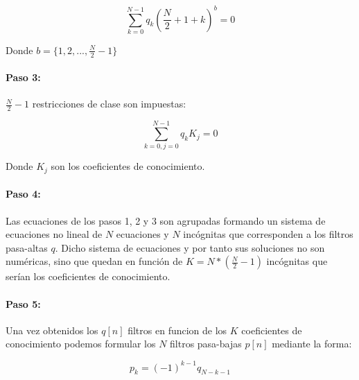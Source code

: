 \documentclass[11pt]{article}
\begin{document}
\begin{equation}
    \sum_{k=0}^{N - 1} q_{k}(\frac{N}{2} + 1 + k)^b = 0
\end{equation}

Donde \(b = \{1, 2, ..., \frac{N}{2} - 1\}\)

\paragraph*{Paso 3:}
\(\frac{N}{2} - 1\) restricciones de clase son impuestas:

\begin{equation}
    \sum_{k=0, j=0}^{N - 1} q_{k}K_{j} = 0
\end{equation}

Donde \(K_{j}\) son los coeficientes de conocimiento.

\paragraph*{Paso 4:}
Las ecuaciones de los pasos 1, 2 y 3 son agrupadas formando un sistema de ecuaciones no lineal de \(N\) ecuaciones y \(N\) incógnitas que corresponden a 
los filtros pasa-altas \(q\). Dicho sistema de ecuaciones y por tanto sus soluciones no son numéricas, sino que quedan en función de \(K = N * (\frac{N}{2} - 1)\) 
incógnitas que serían los coeficientes de conocimiento.

\paragraph*{Paso 5:}
Una vez obtenidos los \(q[n]\) filtros en funcion de los \(K\) coeficientes de conocimiento podemos formular 
los \(N\) filtros pasa-bajas \(p[n]\) mediante la forma:

\begin{equation}
    p_{k} = (-1)^{k-1}q_{N - k - 1}
\end{equation}

\end{document}
